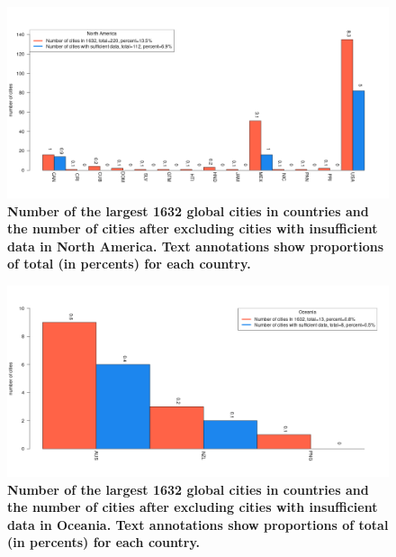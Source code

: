 \documentclass[preprint,10pt]{elsarticle} %
\begin{document}
\begin{figure}
\centering
\includegraphics[trim={ 0 35 25 50 },clip,scale=0.45]{Images2/North America_cities.png}
\caption{\bf Number of the largest 1632 global cities in countries and the number of cities after excluding cities with insufficient data in North America. Text annotations show proportions of total (in percents) for each country.}
 \label{fig:northamerica}
\end{figure}

\begin{figure}
\centering
\includegraphics[trim={ 0 35 25 50 },clip,scale=0.45]{Images2/Oceania_cities.png}
\caption{\bf Number of the largest 1632 global cities in countries and the number of cities after excluding cities with insufficient data in Oceania. Text annotations show proportions of total (in percents) for each country.}
 \label{fig:oceania}
\end{figure}
\end{document}

